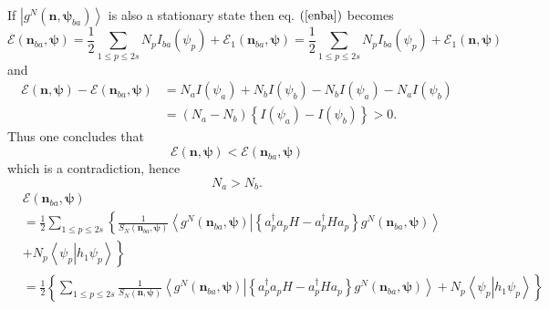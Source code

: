 \documentclass[aps,preprint]{revtex4}%
\begin{document}
If $\left\vert g^{N}\left(  \mathbf{n},\mathbf{\psi}_{ba}\right)
\right\rangle $ is also a stationary state then eq. $\left(  \ref{enba}%
\right)  $ becomes
\begin{equation}
\mathcal{E}\left(  \mathbf{n}_{ba},\mathbf{\psi}\right)  =\frac{1}{2}%
\sum_{1\leq p\leq2s}N_{p}I_{ba}\left(  \psi_{p}\right)  +\mathcal{E}%
_{1}\left(  \mathbf{n}_{ba},\mathbf{\psi}\right)  =\frac{1}{2}\sum_{1\leq
p\leq2s}N_{p}I_{ba}\left(  \psi_{p}\right)  +\mathcal{E}_{1}\left(
\mathbf{n},\mathbf{\psi}\right)
\end{equation}
and
\begin{align}
\mathcal{E}\left(  \mathbf{n},\mathbf{\psi}\right)  -\mathcal{E}\left(
\mathbf{n}_{ba},\mathbf{\psi}\right)   &  =N_{a}I\left(  \psi_{a}\right)
+N_{b}I\left(  \psi_{b}\right)  -N_{b}I\left(  \psi_{a}\right)  -N_{a}I\left(
\psi_{b}\right)  \nonumber\\
&  =\left(  N_{a}-N_{b}\right)  \left\{  I\left(  \psi_{a}\right)  -I\left(
\psi_{b}\right)  \right\}  >0.
\end{align}
Thus one concludes that
\begin{equation}
\mathcal{E}\left(  \mathbf{n},\mathbf{\psi}\right)  <\mathcal{E}\left(
\mathbf{n}_{ba},\mathbf{\psi}\right)
\end{equation}
which is a contradiction, hence
\begin{equation}
N_{a}>N_{b}.
\end{equation}%
\begin{align}
&  \mathcal{E}\left(  \mathbf{n}_{ba},\mathbf{\psi}\right)  \nonumber\\
&  =\frac{1}{2}%
{\textstyle\sum\limits_{1\leq p\leq2s}}
\left\{  \frac{1}{S_{N}\left(  \mathbf{n}_{ba},\mathbf{\psi}\right)
}\left\langle \left.  g^{N}\left(  \mathbf{n}_{ba},\mathbf{\psi}\right)
\right\vert \left\{  a_{p}^{\dagger}a_{p}H-a_{p}^{\dagger}Ha_{p}\right\}
g^{N}\left(  \mathbf{n}_{ba},\mathbf{\psi}\right)  \right\rangle \right.  \\
&  +\left.  N_{p}\left\langle \left.  \psi_{p}\right\vert h_{1}\psi
_{p}\right\rangle \right\}  \\
&  =\frac{1}{2}\left\{
{\textstyle\sum\limits_{1\leq p\leq2s}}
\frac{1}{S_{N}\left(  \mathbf{n},\mathbf{\psi}\right)  }\left\langle \left.
g^{N}\left(  \mathbf{n}_{ba},\mathbf{\psi}\right)  \right\vert \left\{
a_{p}^{\dagger}a_{p}H-a_{p}^{\dagger}Ha_{p}\right\}  g^{N}\left(
\mathbf{n}_{ba},\mathbf{\psi}\right)  \right\rangle +N_{p}\left\langle \left.
\psi_{p}\right\vert h_{1}\psi_{p}\right\rangle \right\}
\end{align}%
\end{document}
